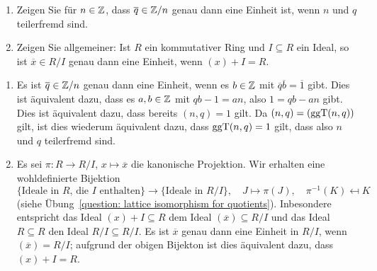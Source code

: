 \begin{question}
  \label{question: unit group of quotients}
  \begin{enumerate}
    \item
      Zeigen Sie für $n \in \mathbb{Z}$, dass $\overline{q} \in \mathbb{Z}/n$ genau dann eine Einheit ist, wenn $n$ und $q$ teilerfremd sind.
    \item
      Zeigen Sie allgemeiner:
      Ist $R$ ein kommutativer Ring und $I \subseteq R$ ein Ideal, so ist $\overline{x} \in R/I$ genau dann eine Einheit, wenn $(x) + I = R$.
  \end{enumerate}
\end{question}


\begin{solution}
  \begin{enumerate}
    \item 
      Es ist $\overline{q} \in \mathbb{Z}/n$ genau dann eine Einheit, wenn es $b \in \mathbb{Z}$ mit $\overline{q} \overline{b} = \overline{1}$ gibt.
      Dies ist äquivalent dazu, dass es $a, b \in \mathbb{Z}$ mit $qb - 1 = an$, also $1 = qb - an$ gibt.
      Dies ist äquivalent dazu, dass bereits $(n,q) = 1$ gilt.
      Da $(n,q) = (\operatorname{ggT}(n,q))$ gilt, ist dies wiederum äquivalent dazu, dass $\operatorname{ggT}(n,q) = 1$ gilt, dass also $n$ und $q$ teilerfremd sind.
    \item
      Es sei $\pi \colon R \to R/I$, $x \mapsto \overline{x}$ die kanonische Projektion.
      Wir erhalten eine wohldefinierte Bijektion
      \[
              \{\text{Ideale in $R$, die $I$ enthalten}\}
        \to   \{\text{Ideale in $R/I$}\},
        \quad J \mapsto \pi(J),
        \quad \pi^{-1}(K) \mapsfrom K
      \]
      (siehe Übung~\ref{question: lattice isomorphism for quotients}).
      Inbesondere entspricht das Ideal $(x) + I \subseteq R$ dem Ideal $(\overline{x}) \subseteq R/I$ und das Ideal $R \subseteq R$ den Ideal $R/I \subseteq R/I$.
      Es ist $\overline{x}$ genau dann eine Einheit in $R/I$, wenn $(\overline{x}) = R/I$;
      aufgrund der obigen Bijekton ist dies äquivalent dazu, dass $(x) + I = R$.
  \end{enumerate}
\end{solution}


